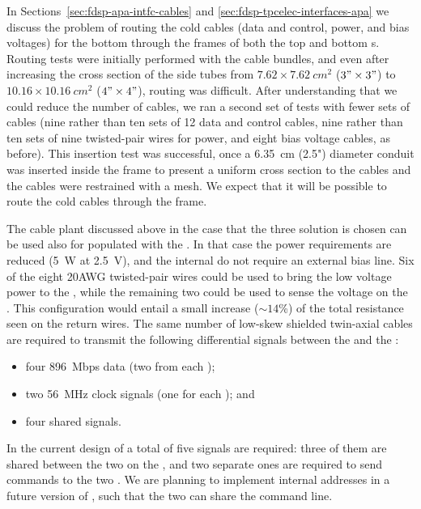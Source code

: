 In Sections~\ref{sec:fdsp-apa-intfc-cables} and \ref{sec:fdsp-tpcelec-interfaces-apa}
we discuss the problem of routing the cold cables (data and control, power, and
bias voltages) for the bottom  through the frames of both
the top and bottom s. Routing tests were initially performed
with the  cable bundles, and even after increasing
the cross section of the side tubes from $\num{7.62}\times\SI{7.62}{cm^2}$ ($3"\times3"$)
to $\num{10.16}\times\SI{10.16}{cm^2}$ ($4"\times4"$), routing was difficult. After understanding that we
could reduce the number of cables, we ran a second set of tests with fewer sets
of cables (nine rather than ten sets of 12 data and control cables, nine rather than
ten sets of nine twisted-pair wires for power, and eight bias voltage cables, as before).
This insertion test was successful, once
a \SI{6.35}{cm} (2.5") diameter conduit was inserted inside the
 frame to present a uniform cross section to
the cables and the cables were restrained with a mesh. We expect that it will be possible
to route the cold cables through the  frame.

The cable plant discussed above in the case that the three 
solution is chosen can be used also for  populated with the
 . In that case the power requirements are 
reduced (\SI{5}{W} at \SI{2.5}{V}), and the internal  do
not require an external bias line. Six of the eight \num{20}AWG twisted-pair
wires could be used to bring the low voltage power to the ,
while the remaining two could be used to sense the voltage on the .
This configuration would entail a small increase ($\sim14$\%) of the 
total resistance seen on the return wires. The same number of low-skew shielded
twin-axial cables are required to transmit the following differential signals
between the  and the :
\begin{itemize}
\item four \SI{896}{Mbps} data (two from each );
\item two \SI{56}{MHz} clock signals (one for each ); and
\item four shared  signals.
\end{itemize}
In the current design of  a total of five  signals
are required: three of them are shared between the two  on the
, and two separate ones are required to send commands to the
two  . We are planning to implement internal 
addresses in a future version of , such that the two 
can share the command line.

